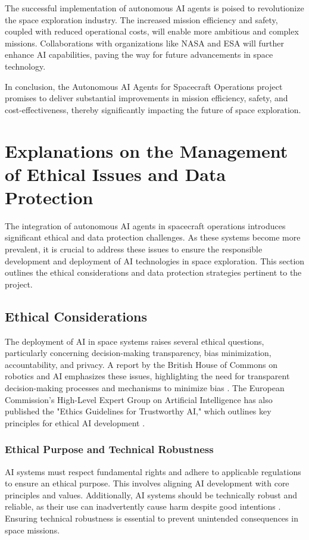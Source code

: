 \documentclass[a4paper, 11pt]{article}
\begin{document}
The successful implementation of autonomous AI agents is poised to revolutionize the space exploration industry. The increased mission efficiency and safety, coupled with reduced operational costs, will enable more ambitious and complex missions. Collaborations with organizations like NASA and ESA will further enhance AI capabilities, paving the way for future advancements in space technology.

In conclusion, the Autonomous AI Agents for Spacecraft Operations project promises to deliver substantial improvements in mission efficiency, safety, and cost-effectiveness, thereby significantly impacting the future of space exploration.
\section{Explanations on the Management of Ethical Issues and Data Protection}

The integration of autonomous AI agents in spacecraft operations introduces significant ethical and data protection challenges. As these systems become more prevalent, it is crucial to address these issues to ensure the responsible development and deployment of AI technologies in space exploration. This section outlines the ethical considerations and data protection strategies pertinent to the project.

\subsection{Ethical Considerations}

The deployment of AI in space systems raises several ethical questions, particularly concerning decision-making transparency, bias minimization, accountability, and privacy. A report by the British House of Commons on robotics and AI emphasizes these issues, highlighting the need for transparent decision-making processes and mechanisms to minimize bias \cite{house_of_commons_report}. The European Commission's High-Level Expert Group on Artificial Intelligence has also published the "Ethics Guidelines for Trustworthy AI," which outlines key principles for ethical AI development \cite{ai_hleg_guidelines}.

\subsubsection{Ethical Purpose and Technical Robustness}

AI systems must respect fundamental rights and adhere to applicable regulations to ensure an ethical purpose. This involves aligning AI development with core principles and values. Additionally, AI systems should be technically robust and reliable, as their use can inadvertently cause harm despite good intentions \cite{ai_hleg_guidelines}. Ensuring technical robustness is essential to prevent unintended consequences in space missions.
\end{document}
